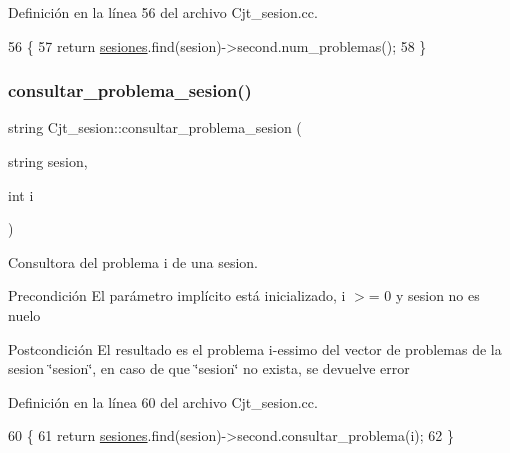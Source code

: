 Definición en la línea 56 del archivo Cjt\+\_\+sesion.\+cc.


\begin{DoxyCode}
56                                                   \{
57   \textcolor{keywordflow}{return} \mbox{\hyperlink{class_cjt__sesion_abac1c2ee3cccc598a8274c7da869aa9b}{sesiones}}.find(sesion)->second.num\_problemas();
58 \}
\end{DoxyCode}
\mbox{\label{class_cjt__sesion_a7bc8395d0f4702cd383b11efab65feb1}} 
\subsubsection{\texorpdfstring{consultar\+\_\+problema\+\_\+sesion()}{consultar\_problema\_sesion()}}
{\footnotesize\ttfamily string Cjt\+\_\+sesion\+::consultar\+\_\+problema\+\_\+sesion (\begin{DoxyParamCaption}\item[{string}]{sesion,  }\item[{int}]{i }\end{DoxyParamCaption})}



Consultora del problema i de una sesion. 

\begin{DoxyPrecond}{Precondición}
El parámetro implícito está inicializado, i $>$= 0 y sesion no es nuelo 
\end{DoxyPrecond}
\begin{DoxyPostcond}{Postcondición}
El resultado es el problema i-\/essimo del vector de problemas de la sesion \char`\"{}sesion\char`\"{}, en caso de que \char`\"{}sesion\char`\"{} no exista, se devuelve error 
\end{DoxyPostcond}


Definición en la línea 60 del archivo Cjt\+\_\+sesion.\+cc.


\begin{DoxyCode}
60                                                                  \{
61   \textcolor{keywordflow}{return} \mbox{\hyperlink{class_cjt__sesion_abac1c2ee3cccc598a8274c7da869aa9b}{sesiones}}.find(sesion)->second.consultar\_problema(i);
62 \}
\end{DoxyCode}
\mbox{\label{class_cjt__sesion_ad64b0e5339bd3a04de4fba88d6eb98c7}} 

